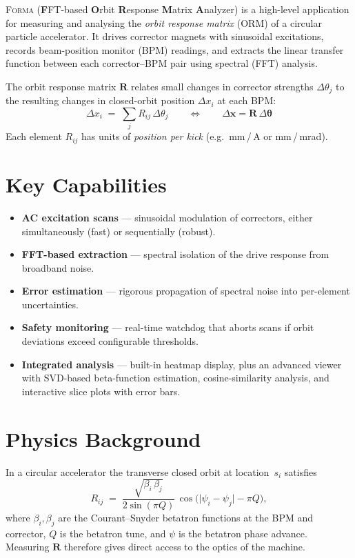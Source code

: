 \documentclass[11pt,a4paper,twoside]{report}
\newcommand{\forma}{\textsc{Forma}}
\begin{document}
\forma{} (\textbf{F}FT-based \textbf{O}rbit \textbf{R}esponse \textbf{M}atrix \textbf{A}nalyzer) is a high-level application for measuring and analysing the \emph{orbit response matrix} (ORM) of a circular particle accelerator. It drives corrector magnets with sinusoidal excitations, records beam-position monitor (BPM) readings, and extracts the linear transfer function between each corrector--BPM pair using spectral (FFT) analysis.

\begin{defbox}
The orbit response matrix $\mathbf{R}$ relates small changes in corrector strengths $\Delta\theta_j$ to the resulting changes in closed-orbit position $\Delta x_i$ at each BPM:
\[
  \Delta x_i \;=\; \sum_{j} R_{ij}\,\Delta\theta_j
  \qquad\Longleftrightarrow\qquad
  \Delta\mathbf{x} = \mathbf{R}\,\Delta\boldsymbol{\theta}
\]
Each element $R_{ij}$ has units of \emph{position per kick} (e.g.\ mm\,/\,A or mm\,/\,mrad).
\end{defbox}

\section{Key Capabilities}

\begin{itemize}
  \item \textbf{AC excitation scans} --- sinusoidal modulation of correctors, either simultaneously (fast) or sequentially (robust).
  \item \textbf{FFT-based extraction} --- spectral isolation of the drive response from broadband noise.
  \item \textbf{Error estimation} --- rigorous propagation of spectral noise into per-element uncertainties.
  \item \textbf{Safety monitoring} --- real-time watchdog that aborts scans if orbit deviations exceed configurable thresholds.
  \item \textbf{Integrated analysis} --- built-in heatmap display, plus an advanced viewer with SVD-based beta-function estimation, cosine-similarity analysis, and interactive slice plots with error bars.
\end{itemize}

\section{Physics Background}\label{sec:physics}

In a circular accelerator the transverse closed orbit at location~$s_i$ satisfies
\begin{equation}\label{eq:orm-theory}
  R_{ij}
  \;=\;
  \frac{\sqrt{\beta_i\,\beta_j}}{2\sin(\pi Q)}\,
  \cos\!\bigl(\lvert\psi_i - \psi_j\rvert - \pi Q\bigr),
\end{equation}
where $\beta_i,\beta_j$ are the Courant--Snyder betatron functions at the BPM and corrector, $Q$ is the betatron tune, and $\psi$ is the betatron phase advance. Measuring $\mathbf{R}$ therefore gives direct access to the optics of the machine.
\end{document}
